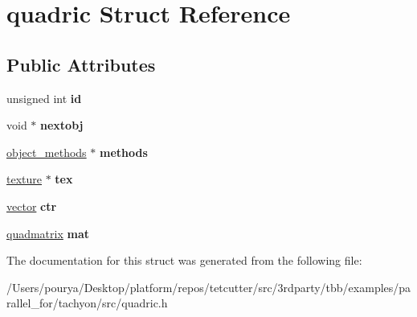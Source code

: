 \hypertarget{structquadric}{}\section{quadric Struct Reference}
\label{structquadric}
\subsection*{Public Attributes}
\begin{DoxyCompactItemize}
\item 
\hypertarget{structquadric_aa7c57e18fa838ca5b134a311e3ef5a95}{}unsigned int {\bfseries id}\label{structquadric_aa7c57e18fa838ca5b134a311e3ef5a95}

\item 
\hypertarget{structquadric_a44e91100ff940d5a846fa01f2895d5b0}{}void $\ast$ {\bfseries nextobj}\label{structquadric_a44e91100ff940d5a846fa01f2895d5b0}

\item 
\hypertarget{structquadric_a8d7cdd1ce7af31c03656814b37fb2546}{}\hyperlink{structobject__methods}{object\+\_\+methods} $\ast$ {\bfseries methods}\label{structquadric_a8d7cdd1ce7af31c03656814b37fb2546}

\item 
\hypertarget{structquadric_aceca7f5ac42ce368885eae74483cc646}{}\hyperlink{structtexture}{texture} $\ast$ {\bfseries tex}\label{structquadric_aceca7f5ac42ce368885eae74483cc646}

\item 
\hypertarget{structquadric_a0a706442f64dd85d0fd9b02c601336cf}{}\hyperlink{structvector}{vector} {\bfseries ctr}\label{structquadric_a0a706442f64dd85d0fd9b02c601336cf}

\item 
\hypertarget{structquadric_ae909a396c6f2da41e4dcb35b5ba9bbf8}{}\hyperlink{structquadmatrix}{quadmatrix} {\bfseries mat}\label{structquadric_ae909a396c6f2da41e4dcb35b5ba9bbf8}

\end{DoxyCompactItemize}


The documentation for this struct was generated from the following file\+:\begin{DoxyCompactItemize}
\item 
/\+Users/pourya/\+Desktop/platform/repos/tetcutter/src/3rdparty/tbb/examples/parallel\+\_\+for/tachyon/src/quadric.\+h\end{DoxyCompactItemize}
